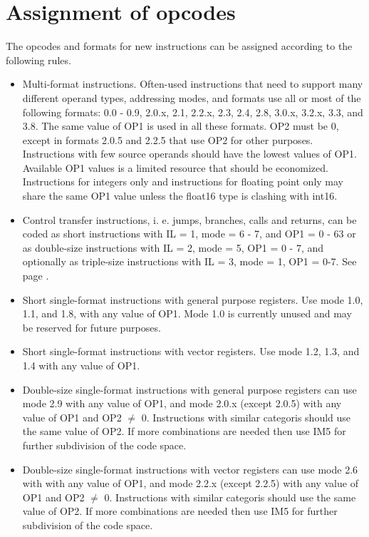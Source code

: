 \documentclass[forwardcom.tex]{subfiles}
\begin{document}
\section{Assignment of opcodes}
The opcodes and formats for new instructions can be assigned according to the following rules.

\begin{itemize}
\item Multi-format instructions. Often-used instructions that need to support many different operand types, addressing modes, and formats use all or most of the following formats: 0.0 - 0.9, 2.0.x, 2.1, 2.2.x, 2.3, 2.4, 2.8, 3.0.x, 3.2.x, 3.3, and 3.8. The same value of OP1 is used in all these formats. OP2 must be 0, except in formats 2.0.5 and 2.2.5 that use OP2 for other purposes. Instructions with few source operands should have the lowest values of OP1. Available OP1 values is a limited resource that should be economized. Instructions for integers only and instructions for floating point only may share the same OP1 value unless the float16 type is clashing with int16.

\item Control transfer instructions, i. e. jumps, branches, calls and returns, can be coded as short instructions with IL = 1, mode = 6 - 7, and OP1 = 0 - 63 or as double-size instructions with IL = 2, mode = 5, OP1 = 0 - 7, and optionally as triple-size instructions with IL = 3, mode = 1, OP1 = 0-7. See page \pageref{table:jumpInstructionFormats}.

\item Short single-format instructions with general purpose registers. Use mode 1.0, 1.1, and 1.8, with any value of OP1. Mode 1.0 is currently unused and may be reserved for future purposes.

\item Short single-format instructions with vector registers. Use mode 1.2, 1.3, and 1.4 with any value of OP1.

\item Double-size single-format instructions with general purpose registers can use mode 2.9 with any value of OP1, and mode 2.0.x (except 2.0.5) with any value of OP1 and OP2 $\neq$ 0. Instructions with similar categoris should use the same value of OP2. If more combinations are needed then use IM5 for further subdivision of the code space.

\item Double-size single-format instructions with vector registers can use mode 2.6 with with any value of OP1, and mode 2.2.x (except 2.2.5) with any value of OP1 and OP2 $\neq$ 0. Instructions with similar categoris should use the same value of OP2.  If more combinations are needed then use IM5 for further subdivision of the code space.


\end{itemize}
\end{document}
